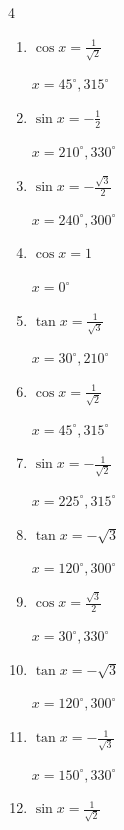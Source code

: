 \begin{multicols}{4}
\begin{enumerate}
  \item $\displaystyle \cos{x}  = \frac{1}{\sqrt{2}}$

        $\displaystyle x = 45^{\circ} , 315^{\circ}$

  \item $\displaystyle \sin{x}  = -\frac{1}{2}$

        $\displaystyle x = 210^{\circ} , 330^{\circ}$

\columnbreak %

  \item $\displaystyle \sin{x}  = -\frac{\sqrt{3}}{2}$

        $\displaystyle x = 240^{\circ} , 300^{\circ}$

  \item $\displaystyle \cos{x}  = 1$

        $\displaystyle x = 0^{\circ}$

  \item $\displaystyle \tan{x}  = \frac{1}{\sqrt{3}}$

        $\displaystyle x = 30^{\circ} , 210^{\circ}$

  \item $\displaystyle \cos{x}  = \frac{1}{\sqrt{2}}$

        $\displaystyle x = 45^{\circ} , 315^{\circ}$

  \item $\displaystyle \sin{x}  = -\frac{1}{\sqrt{2}}$

        $\displaystyle x = 225^{\circ} , 315^{\circ}$

  \item $\displaystyle \tan{x}  = -\sqrt{3}$

        $\displaystyle x = 120^{\circ} , 300^{\circ}$

  \item $\displaystyle \cos{x}  = \frac{\sqrt{3}}{2}$

        $\displaystyle x = 30^{\circ} , 330^{\circ}$

  \item $\displaystyle \tan{x}  = -\sqrt{3}$

        $\displaystyle x = 120^{\circ} , 300^{\circ}$

  \item $\displaystyle \tan{x}  = -\frac{1}{\sqrt{3}}$

        $\displaystyle x = 150^{\circ} , 330^{\circ}$

  \item $\displaystyle \sin{x}  = \frac{1}{\sqrt{2}}$


\end{enumerate}
\end{multicols}
